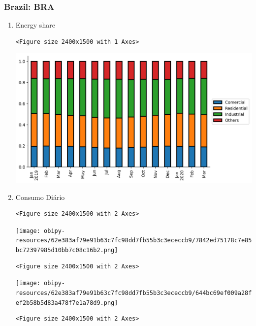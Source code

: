 \documentclass[11pt]{article}
\begin{document}
\subsubsection{Brazil: BRA}
\label{sec:orgf6b096f}
\begin{enumerate}
\item Energy share
\label{sec:org3e58764}

\begin{verbatim}
<Figure size 2400x1500 with 1 Axes>
\end{verbatim}


\begin{center}
\includegraphics[width=.9\linewidth]{obipy-resources/62e383af79e91b63c7fc98dd7fb55b3c3ececcb9/b9bb93431770d5b32665b50dc4549f5f948c88a6.png}
\end{center}

\item Consumo Diário
\label{sec:org03e532b}

\begin{verbatim}
<Figure size 2400x1500 with 2 Axes>
\end{verbatim}


\begin{center}
\texttt{[image: obipy-resources/62e383af79e91b63c7fc98dd7fb55b3c3ececcb9/7842ed75178c7e85bc72397985d10bb7c08c16b2.png]}
\end{center}

\begin{verbatim}
<Figure size 2400x1500 with 2 Axes>
\end{verbatim}


\begin{center}
\texttt{[image: obipy-resources/62e383af79e91b63c7fc98dd7fb55b3c3ececcb9/644bc69ef009a28fef2b58b5d83a478f7e1a78d9.png]}
\end{center}

\begin{verbatim}
<Figure size 2400x1500 with 2 Axes>
\end{verbatim}



\end{enumerate}
\end{document}
